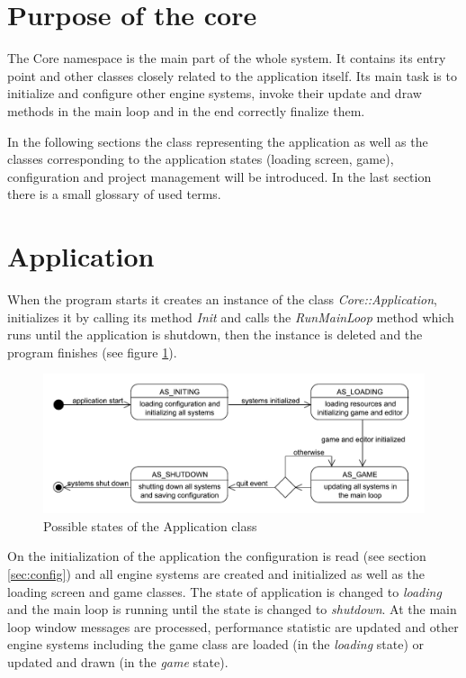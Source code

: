 \documentclass[a4paper, 12pt]{report}
\begin{document}
\section{Purpose of the core}

The Core namespace is the main part of the whole system. It contains its entry point and other classes closely related to the application itself. Its main task is to initialize and configure other engine systems, invoke their update and draw methods in the main loop and in the end correctly finalize them.

In the following sections the class representing the application as well as the classes corresponding to the application states (loading screen, game), configuration and project management will be introduced. In the last section there is a small glossary of used terms.

\section{Application}

When the program starts it creates an instance of the class \emph{Core::Application}, initializes it by calling its method \emph{Init} and calls the \emph{RunMainLoop} method which runs until the application is shutdown, then the instance is deleted and the program finishes (see figure \ref{fig:application-states}).

\begin{figure}[htbp]
	\centering
		\includegraphics[width=1\textwidth]{ApplicationStates.pdf}
	\caption{Possible states of the Application class}
	\label{fig:application-states}
\end{figure}

On the initialization of the application the configuration is read (see section \ref{sec:config}) and all engine systems are created and initialized as well as the loading screen and game classes. The state of application is changed to \emph{loading} and the main loop is running until the state is changed to \emph{shutdown}. At the main loop window messages are processed, performance statistic are updated and other engine systems including the game class are loaded (in the \emph{loading} state) or updated and drawn (in the \emph{game} state).
\end{document}
